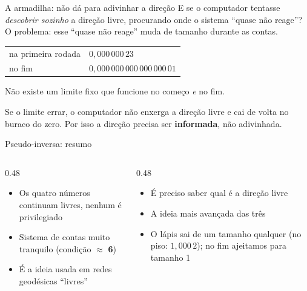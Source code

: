\documentclass[aspectratio=169,11pt]{beamer}
\newcommand{\bnum}[1]{\textbf{\textcolor{mTeal}{#1}}}
\begin{document}
\begin{frame}{A armadilha: não dá para adivinhar a direção}
  E se o computador tentasse \emph{descobrir sozinho} a direção livre, procurando onde o
  sistema ``quase não reage''? O problema: esse ``quase não reage'' muda de tamanho
  durante as contas.
  \begin{center}
  \renewcommand{\arraystretch}{1.2}
  \begin{tabular}{ll}
    \toprule
    na primeira rodada & $0{,}000\,000\,23$ \\
    no fim & $0{,}000\,000\,000\,000\,000\,01$ \\
    \bottomrule
  \end{tabular}
  \end{center}
  Não existe um limite fixo que funcione no começo \emph{e} no fim.
  \smallskip

  \begin{armadilha}
    Se o limite errar, o computador \alert{não enxerga a direção livre} e cai de volta no
    buraco do zero. Por isso a direção precisa ser \bnum{informada}, não adivinhada.
  \end{armadilha}
\end{frame}

\begin{frame}{Pseudo-inversa: resumo}
  \begin{columns}[T]
    \begin{column}{0.48\textwidth}
      \begin{ideia}[title={Vantagens}]
        \begin{itemize}
          \item Os quatro números continuam livres, nenhum é privilegiado
          \item Sistema de contas muito tranquilo (condição $\approx$ \bnum{6})
          \item É a ideia usada em redes geodésicas ``livres''
        \end{itemize}
      \end{ideia}
    \end{column}
    \begin{column}{0.48\textwidth}
      \begin{cuidado}[title={Cuidados}]
        \begin{itemize}
          \item É preciso saber qual é a direção livre
          \item A ideia mais avançada das três
          \item O lápis sai de um tamanho qualquer (no piso: $1{,}000\,2$); no fim ajeitamos
                para tamanho 1
        \end{itemize}
      \end{cuidado}
    \end{column}
  \end{columns}
\end{frame}
\end{document}
